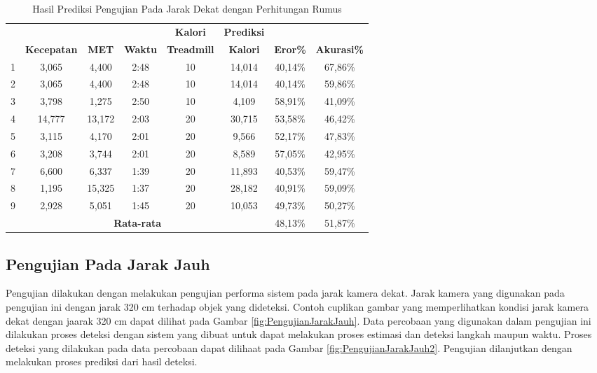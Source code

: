 \begin{longtable}{|c|c|c|c|c|c|c|c|}
  \caption{Hasil Prediksi Pengujian Pada Jarak Dekat dengan Perhitungan Rumus}
  \label{tb:PengujianJarakDekatAnalisaPrediksiPerhitungan}                                   \\
  \hline
  \rowcolor[HTML]{C0C0C0}
  & & & & \textbf{Kalori} & \textbf{Prediksi} & & \\
  \rowcolor[HTML]{C0C0C0}
  \multirow{-2}{*}{\textbf{Percobaan}} & \multirow{-2}{*}{\textbf{Kecepatan}} & \multirow{-2}{*}{\textbf{MET}} & \multirow{-2}{*}{\textbf{Waktu}} & \textbf{Treadmill} & \textbf{Kalori} & \multirow{-2}{*}{\textbf{Eror\%}} & \multirow{-2}{*}{\textbf{Akurasi\%}} \\
  \hline
  1   & 3,065   & 4,400    & 2:48    & 10   & 14,014   & 40,14\%     & 67,86\%   \\
  \hline
  2   & 3,065   & 4,400    & 2:48    & 10   & 14,014   & 40,14\%     & 59,86\%   \\
  \hline
  3   & 3,798   & 1,275    & 2:50    & 10   & 4,109    & 58,91\%     & 41,09\%   \\
  \hline
  4   & 14,777  & 13,172   & 2:03    & 20   & 30,715   & 53,58\%      & 46,42\%   \\
  \hline
  5   & 3,115   & 4,170    & 2:01    & 20   & 9,566    & 52,17\%     & 47,83\%   \\
  \hline
  6   & 3,208   & 3,744    & 2:01    & 20   & 8,589    & 57,05\%      & 42,95\%   \\
  \hline
  7   & 6,600   & 6,337    & 1:39    & 20    & 11,893  & 40,53\%      & 59,47\%   \\
  \hline
  8   & 1,195   & 15,325   & 1:37    & 20    & 28,182  & 40,91\%      & 59,09\%   \\
  \hline
  9   & 2,928   & 5,051    & 1:45    & 20    & 10,053  & 49,73\%      & 50,27\%   \\
  \hline

  \multicolumn{6}{|c|}{\textbf{Rata-rata}} & 48,13\% & 51,87\%  \\
  \hline
\end{longtable}


\subsection{Pengujian Pada Jarak Jauh}
\label{subsec:PengujianJarakJauh}

Pengujian dilakukan dengan melakukan pengujian performa sistem pada jarak kamera dekat. Jarak kamera yang digunakan pada pengujian ini dengan jarak 320 cm terhadap objek yang dideteksi. Contoh cuplikan gambar yang memperlihatkan kondisi jarak kamera dekat dengan jaarak 320 cm dapat dilihat pada Gambar \ref{fig:PengujianJarakJauh}. Data percobaan yang digunakan dalam pengujian ini dilakukan proses deteksi dengan sistem yang dibuat untuk dapat melakukan proses estimasi dan deteksi langkah maupun waktu. Proses deteksi yang dilakukan pada data percobaan dapat dilihaat pada Gambar \ref{fig:PengujianJarakJauh2}. Pengujian dilanjutkan dengan melakukan proses prediksi dari hasil deteksi.

